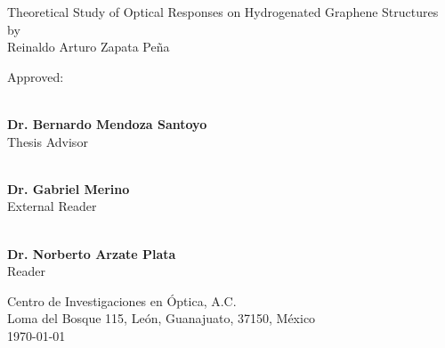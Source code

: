 \begin{titlingpage*}

\begin{center}
    \vspace*{1cm}
    {\LARGE Theoretical Study of Optical Responses on Hydrogenated Graphene
    Structures}\\
    \vspace{0.7cm}
    {\large by}\\
    \vspace{0.7cm}
    {\Large Reinaldo Arturo Zapata Pe\~na}
\end{center}

\vfill
{\Large Approved:}

\begin{flushright}

\vspace*{1cm}

\makebox[0.5\textwidth ]{\hrulefill}\\
\textbf{Dr. Bernardo Mendoza Santoyo}\\ Thesis Advisor
\vspace{1.25cm}

\makebox[0.5\textwidth ]{\hrulefill}\\
\textbf{Dr. Gabriel Merino}\\ External Reader
\vspace{1.25cm}

\makebox[0.5\textwidth ]{\hrulefill}\\
\textbf{Dr. Norberto Arzate Plata}\\ Reader
\vfill

\end{flushright}

\begin{center}
    {\large 
    Centro de Investigaciones en \'Optica, A.C.\\
    Loma del Bosque 115, Le\'on, Guanajuato, 37150, M\'exico\\
    \today
    }
\end{center}

\end{titlingpage*}
